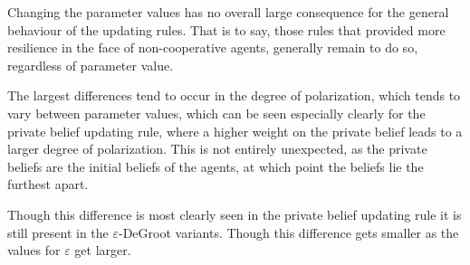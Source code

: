 \documentclass[a4paper, 12pt]{report}
\begin{document}
Changing the parameter values has no overall large consequence for the general behaviour of the updating rules. That is to say, those rules that provided more resilience in the face of non-cooperative agents, generally remain to do so, regardless of parameter value. 

The largest differences tend to occur in the degree of polarization, which tends to vary between parameter values, which can be seen especially clearly for the private belief updating rule, where a higher weight on the private belief leads to a larger degree of polarization. This is not entirely unexpected, as the private beliefs are the initial beliefs of the agents, at which point the beliefs lie the furthest apart.

Though this difference is most clearly seen in the private belief updating rule it is still present in the $\varepsilon$-DeGroot variants. Though this difference gets smaller as the values for $\varepsilon$ get larger.

\newpage
\end{document}
